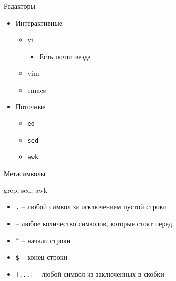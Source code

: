 \begin{frame}{Редакторы}
	\begin{itemize}
		\item Интерактивные
			\begin{itemize}
				\item vi
					\begin{itemize}
						\item Есть почти везде
					\end{itemize}
				\item vim
				\item emacs
			\end{itemize}
		\item Поточные
			\begin{itemize}
				\item {\tt ed}
				\item {\tt sed}
				\item {\tt awk}
			\end{itemize}
	\end{itemize}
\end{frame}

\begin{frame}[fragile]{Метасимволы}
	\begin{block}{grep, sed, awk}
	\end{block}
	\begin{itemize}
		\item {\tt .} -- любой символ за исключением пустой строки
		\item {\tt *} -- любоe количество символов, которые стоят перед {\tt *}
		\item {\tt \^{}} -- начало строки
		\item {\tt \$} -- конец строки
		\item {\tt [...]} -- любой символ из заключенных в скобки
	\end{itemize}
\end{frame}

